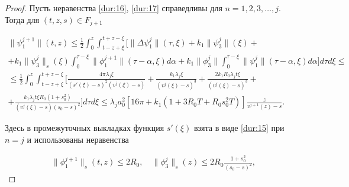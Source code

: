 \begin{proof}
Пусть  неравенства \eqref{dur:16}, \eqref{dur:17} справедливы для $n = 1, 2, 3, \ldots , j$. Тогда для $(t, z, s)  \in {F_{j + 1}}$

\begin{multline*}

\| {\psi _1^{j + 1}} \|(t,z) \leqslant \frac 12 

\int_0^z \int_{t - z + \xi }^{t + z - \xi } 

\biggl[ \| \Delta \psi _1^j\| (\tau ,\xi ) + k_1 \| \psi _3^j\|(\xi ) +

\\

+ {k_1}\| {\psi _3^j} \|_s(\xi ) \int_0^{\tau  - \xi }   

\| \phi _1^{j + 1}\|(\tau  - \alpha ,\xi )d\alpha  +  

{k_1}\| {\phi _3^j} \|\int_0^{\tau  - \xi } \| {\psi _1^j} \| (\tau  - \alpha ,\xi )d\alpha 

 \biggr]d\tau d\xi  \leqslant 

\\

\leqslant\frac 12 \int_0^z {\int_{t - z + \xi }^{t + z - \xi } 

\biggl[ \frac{{4\pi {\lambda _j}\xi }}{{{{ \left( {s'(\xi ) - s} \right)}^2}({v^j}(\xi ) - s)}}} 

+\frac{{{k_1}{\lambda _j}\xi }}{{{{({v^j}(\xi ) - s)}^3}}} +  \frac{{2{k_1}{R_0}{\lambda _j}t\xi }}{{{{(v^j(\xi ) - s)}^3}}}  + \\ +

\frac{{{k_1}{\lambda _j}t\xi {R_0}(1 + s_0^2)}}{{(v^j(\xi ) - s){{({s_0} - s)}^2}}}   \biggr]d\tau d\xi %

\leqslant{\lambda _j}a_0^2\left[ {16\pi  + {k_1}\left( {1 + 3{R_0}T + {R_0}s_0^2T} \right)} \right]\frac{z}{{{v^{j + 1}}(z) - s}}.

\end{multline*} 

 Здесь в промежуточных выкладках функция $s'(\xi )$ взята в виде \eqref{dur:15} при $n = j$ и использованы неравенства

\begin{gather*}

\| {\phi _1^{j + 1}} \|_s(t,z) \leqslant 2{R_0}, \quad 

\| {\phi _3^j} \|_s (z) \leqslant 2{R_0}\frac{{1 + s_0^2}}{{{{\left( {{s_0} - s} \right)}^2}}},

\end{gather*} 


\end{proof}
